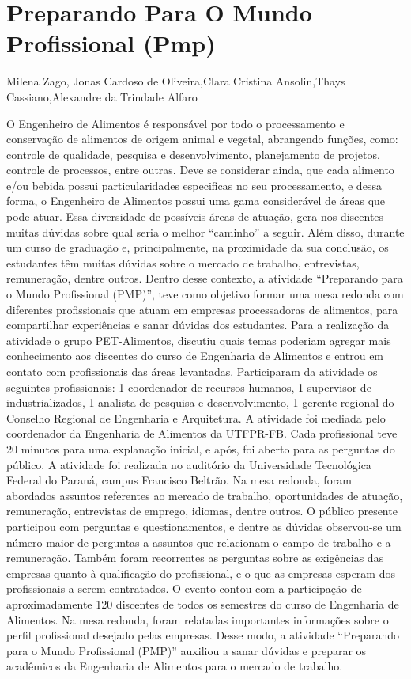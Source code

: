 
\section*{Preparando Para O Mundo Profissional (Pmp)}

Milena Zago, Jonas Cardoso de Oliveira,Clara Cristina Ansolin,Thays Cassiano,Alexandre da Trindade Alfaro

O Engenheiro de Alimentos é responsável por todo o processamento e conservação de alimentos 
de origem animal e vegetal, abrangendo funções, como: controle de qualidade, pesquisa e 
desenvolvimento, planejamento de projetos, controle de processos, entre outras. Deve se 
considerar ainda, que cada alimento e/ou bebida possui particularidades especificas no seu 
processamento, e dessa forma, o Engenheiro de Alimentos possui uma gama considerável de áreas 
que pode atuar. Essa diversidade de possíveis áreas de atuação, gera nos discentes muitas dúvidas 
sobre qual seria o melhor “caminho” a seguir. Além disso, durante um curso de graduação e, 
principalmente, na proximidade da sua conclusão, os estudantes têm muitas dúvidas sobre o 
mercado de trabalho, entrevistas, remuneração, dentre outros. Dentro desse contexto, a atividade 
“Preparando para o Mundo Profissional (PMP)”, teve como objetivo formar uma mesa redonda 
com diferentes profissionais que atuam em empresas processadoras de alimentos, para 
compartilhar experiências e sanar dúvidas dos estudantes. Para a realização da atividade o grupo 
PET-Alimentos, discutiu quais temas poderiam agregar mais conhecimento aos discentes do curso 
de Engenharia de Alimentos e entrou em contato com profissionais das áreas levantadas. 
Participaram da atividade os seguintes profissionais: 1 coordenador de recursos humanos, 1 
supervisor de industrializados, 1 analista de pesquisa e desenvolvimento, 1 gerente regional do 
Conselho Regional de Engenharia e Arquitetura. A atividade foi mediada pelo coordenador da 
Engenharia de Alimentos da UTFPR-FB. Cada profissional teve 20 minutos para uma explanação 
inicial, e após, foi aberto para as perguntas do público. A atividade foi realizada no auditório da 
Universidade Tecnológica Federal do Paraná, campus Francisco Beltrão. Na mesa redonda, foram 
abordados assuntos referentes ao mercado de trabalho, oportunidades de atuação, remuneração, 
entrevistas de emprego, idiomas, dentre outros. O público presente participou com perguntas e 
questionamentos, e dentre as dúvidas observou-se um número maior de perguntas a assuntos que 
relacionam o campo de trabalho e a remuneração. Também foram recorrentes as perguntas sobre 
as exigências das empresas quanto à qualificação do profissional, e o que as empresas esperam dos
profissionais a serem contratados. O evento contou com a participação de aproximadamente 120 
discentes de todos os semestres do curso de Engenharia de Alimentos. Na mesa redonda, foram 
relatadas importantes informações sobre o perfil profissional desejado pelas empresas. Desse 
modo, a atividade “Preparando para o Mundo Profissional (PMP)” auxiliou a sanar dúvidas e 
preparar os acadêmicos da Engenharia de Alimentos para o mercado de trabalho.

